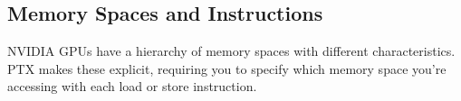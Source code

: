 \subsection{Memory Spaces and Instructions}

NVIDIA GPUs have a hierarchy of memory spaces with different characteristics. PTX makes these explicit, requiring you to specify which memory space you're accessing with each load or store instruction.

